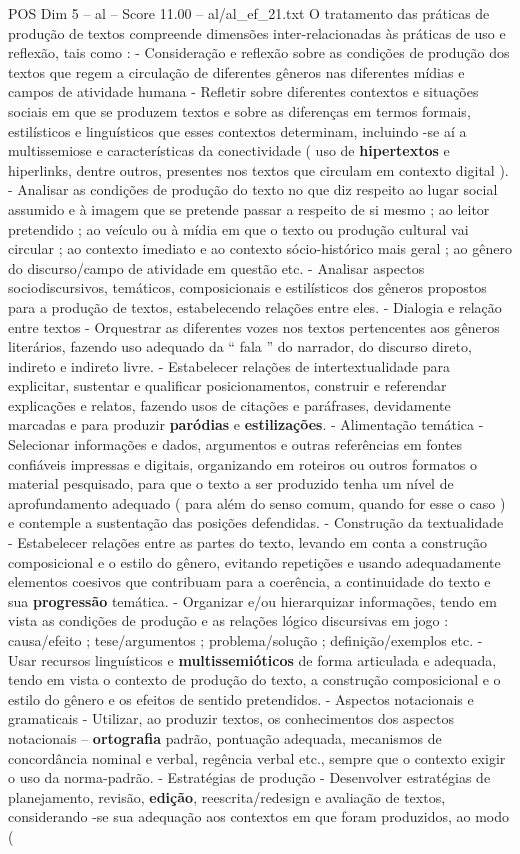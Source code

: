 \begin{textsample}{POS Dim 5 – al – Score 11.00 – al/al\_ef\_21.txt}
O tratamento das práticas de produção de textos compreende dimensões inter-relacionadas às práticas de uso e reflexão, tais como : - Consideração e reflexão sobre as condições de produção dos textos que regem a circulação de diferentes gêneros nas diferentes mídias e campos de atividade humana - Refletir sobre diferentes contextos e situações sociais em que se produzem textos e sobre as diferenças em termos formais, estilísticos e linguísticos que esses contextos determinam, incluindo -se aí a multissemiose e características da conectividade ( uso de \textbf{hipertextos} e hiperlinks, dentre outros, presentes nos textos que circulam em contexto digital ). - Analisar as condições de produção do texto no que diz respeito ao lugar social assumido e à imagem que se pretende passar a respeito de si mesmo ; ao leitor pretendido ; ao veículo ou à mídia em que o texto ou produção cultural vai circular ; ao contexto imediato e ao contexto sócio-histórico mais geral ; ao gênero do discurso/campo de atividade em questão etc. - Analisar aspectos sociodiscursivos, temáticos, composicionais e estilísticos dos gêneros propostos para a produção de textos, estabelecendo relações entre eles. - Dialogia e relação entre textos - Orquestrar as diferentes vozes nos textos pertencentes aos gêneros literários, fazendo uso adequado da “ fala ” do narrador, do discurso direto, indireto e indireto livre. - Estabelecer relações de intertextualidade para explicitar, sustentar e qualificar posicionamentos, construir e referendar explicações e relatos, fazendo usos de citações e paráfrases, devidamente marcadas e para produzir \textbf{paródias} e \textbf{estilizações}. - Alimentação temática - Selecionar informações e dados, argumentos e outras referências em fontes confiáveis impressas e digitais, organizando em roteiros ou outros formatos o material pesquisado, para que o texto a ser produzido tenha um nível de aprofundamento adequado ( para além do senso comum, quando for esse o caso ) e contemple a sustentação das posições defendidas. - Construção da textualidade - Estabelecer relações entre as partes do texto, levando em conta a construção composicional e o estilo do gênero, evitando repetições e usando adequadamente elementos coesivos que contribuam para a coerência, a continuidade do texto e sua \textbf{progressão} temática. - Organizar e/ou hierarquizar informações, tendo em vista as condições de produção e as relações lógico discursivas em jogo : causa/efeito ; tese/argumentos ; problema/solução ; definição/exemplos etc. - Usar recursos linguísticos e \textbf{multissemióticos} de forma articulada e adequada, tendo em vista o contexto de produção do texto, a construção composicional e o estilo do gênero e os efeitos de sentido pretendidos. - Aspectos notacionais e gramaticais - Utilizar, ao produzir textos, os conhecimentos dos aspectos notacionais – \textbf{ortografia} padrão, pontuação adequada, mecanismos de concordância nominal e verbal, regência verbal etc., sempre que o contexto exigir o uso da norma-padrão. - Estratégias de produção - Desenvolver estratégias de planejamento, revisão, \textbf{edição}, reescrita/redesign e avaliação de textos, considerando -se sua adequação aos contextos em que foram produzidos, ao modo ( 
\end{textsample}
